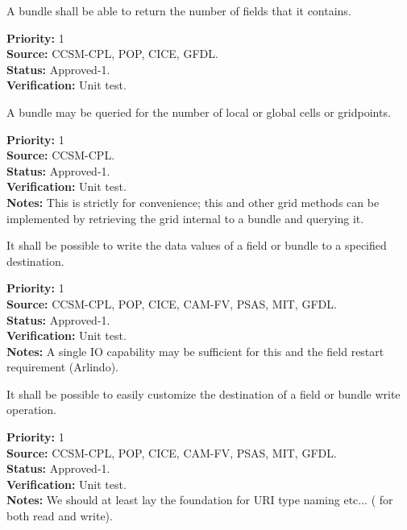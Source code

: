 A bundle shall be able to return the number of fields that it contains.
\begin{reqlist}
{\bf Priority:} 1\\
{\bf Source:} CCSM-CPL, POP, CICE, GFDL. \\
{\bf Status:} Approved-1. \\
{\bf Verification:} Unit test. 
\end{reqlist}

A bundle may be queried for the number of local or global cells
or gridpoints.
\begin{reqlist}
{\bf Priority:} 1\\
{\bf Source:} CCSM-CPL. \\
{\bf Status:} Approved-1. \\
{\bf Verification:} Unit test. \\
{\bf Notes:} This is strictly for convenience; this and other grid
methods can be implemented by retrieving the grid internal to a 
bundle and querying it.
\end{reqlist}


It shall be possible to write the data values of a field or bundle to 
a specified destination. 
\begin{reqlist}
{\bf Priority:} 1\\
{\bf Source:} CCSM-CPL, POP, CICE, CAM-FV, PSAS, MIT, GFDL. \\
{\bf Status:} Approved-1. \\
{\bf Verification:} Unit test. \\
{\bf Notes: } A single IO capability may be sufficient for this and the field 
restart requirement (Arlindo).
\end{reqlist}

It shall be possible to easily customize the destination of 
a field or bundle write operation.
\begin{reqlist}
{\bf Priority:} 1\\
{\bf Source:} CCSM-CPL, POP, CICE, CAM-FV, PSAS, MIT, GFDL.\\
{\bf Status:} Approved-1. \\
{\bf Verification:} Unit test. \\
{\bf Notes:} 
We should at least lay the foundation for URI type naming etc... ( for both
read and write).
\\
\end{reqlist}


